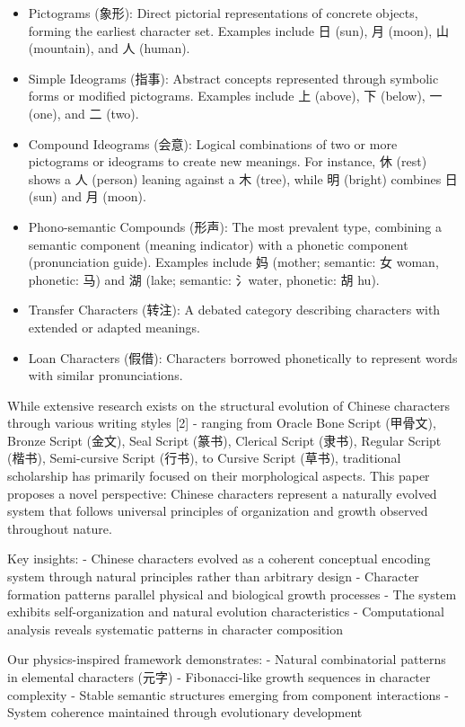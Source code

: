 \documentclass[
]{article}
\begin{document}
\begin{itemize}
\item
  Pictograms (象形): Direct pictorial representations of concrete
  objects, forming the earliest character set. Examples include 日
  (sun), 月 (moon), 山 (mountain), and 人 (human).
\item
  Simple Ideograms (指事): Abstract concepts represented through
  symbolic forms or modified pictograms. Examples include 上 (above), 下
  (below), 一 (one), and 二 (two).
\item
  Compound Ideograms (会意): Logical combinations of two or more
  pictograms or ideograms to create new meanings. For instance, 休
  (rest) shows a 人 (person) leaning against a 木 (tree), while 明
  (bright) combines 日 (sun) and 月 (moon).
\item
  Phono-semantic Compounds (形声): The most prevalent type, combining a
  semantic component (meaning indicator) with a phonetic component
  (pronunciation guide). Examples include 妈 (mother; semantic: 女
  woman, phonetic: 马) and 湖 (lake; semantic: 氵water, phonetic: 胡
  hu).
\item
  Transfer Characters (转注): A debated category describing characters
  with extended or adapted meanings.
\item
  Loan Characters (假借): Characters borrowed phonetically to represent
  words with similar pronunciations.
\end{itemize}

While extensive research exists on the structural evolution of Chinese
characters through various writing styles {[}2{]} - ranging from Oracle
Bone Script (甲骨文), Bronze Script (金文), Seal Script (篆书), Clerical
Script (隶书), Regular Script (楷书), Semi-cursive Script (行书), to
Cursive Script (草书), traditional scholarship has primarily focused on
their morphological aspects. This paper proposes a novel perspective:
Chinese characters represent a naturally evolved system that follows
universal principles of organization and growth observed throughout
nature.

Key insights: - Chinese characters evolved as a coherent conceptual
encoding system through natural principles rather than arbitrary design
- Character formation patterns parallel physical and biological growth
processes - The system exhibits self-organization and natural evolution
characteristics - Computational analysis reveals systematic patterns in
character composition

Our physics-inspired framework demonstrates: - Natural combinatorial
patterns in elemental characters (元字) - Fibonacci-like growth
sequences in character complexity - Stable semantic structures emerging
from component interactions - System coherence maintained through
evolutionary development
\end{document}

